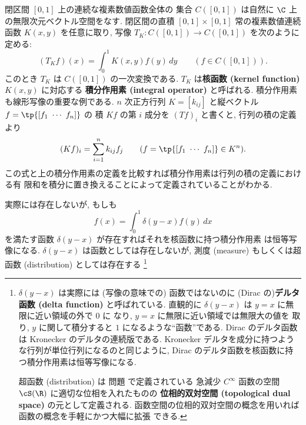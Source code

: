 \documentclass[12pt,twoside]{jarticle}
\begin{document}

\begin{example}[積分作用素]
  閉区間 $[0,1]$ 上の連続な複素数値函数全体の
  集合 $C([0,1])$ は自然に $\C$ 上の無限次元ベクトル空間をなす.  
  閉区間の直積 $[0,1]\times[0,1]$ 常の複素数値連続函数 $K(x,y)$ を任意に取り,
  写像 $T_K:C([0,1])\to C([0,1])$ を次のように定める:
  \begin{equation*}
    (T_K f)(x) = \int_0^1 K(x,y)f(y)\,dy
    \qquad (f\in C([0,1])).
  \end{equation*}
  このとき $T_K$ は $C([0,1])$ の一次変換である.
  $T_K$ は{\bf 核函数 (kernel function)} $K(x,y)$ に対応する
  {\bf 積分作用素 (integral operator)} と呼ばれる.
  積分作用素も線形写像の重要な例である.
  $n$ 次正方行列 $K=[k_{ij}]$ と縦ベクトル $f=\tp{[f_1\ \cdots\ f_n]}$ の
  積 $Kf$ の第 $i$ 成分を $(Tf)_i$ と書くと, 行列の積の定義より
  \begin{equation*}
    (Kf)_i = \sum_{i=1}^n k_{ij}f_j
    \qquad (f=\tp{[f_1\ \cdots\ f_n]}\in K^n).
  \end{equation*}
  この式と上の積分作用素の定義を比較すれば積分作用素は行列の積の定義における有
  限和を積分に置き換えることによって定義されていることがわかる.

  実際には存在しないが, もしも
  \begin{equation*}
    f(x) = \int_0^1 \delta(y-x)f(y)\,dx
  \end{equation*}
  を満たす函数 $\delta(y-x)$ が存在すればそれを核函数に持つ積分作用素
  は恒等写像になる.  $\delta(y-x)$ は函数としては存在しないが, 
  測度 (measure) もしくくは超函数 (distribution) としては存在する%
  \footnote{$\delta(y-x)$ は実際には (写像の意味での) 函数ではないのに 
    (Dirac の){\bf デルタ函数 (delta function)} と呼ばれている.  
    直観的に $\delta(y-x)$ は $y=x$ に無限に近い領域の外で $0$ に
    なり, $y=x$ に無限に近い領域では無限大の値を
    取り, $y$ に関して積分すると $1$ になるような``函数''である.
    Dirac のデルタ函数は Kronecker のデルタの連続版である.
    Kronecker デルタを成分に持つような行列が単位行列になるのと同じように,
    Dirac のデルタ函数を核函数に持つ積分作用素は恒等写像になる.

    超函数 (distribution) は
    問題  で定義されている
    急減少 $C^\infty$ 函数の空間 $\cS(\R)$ に適切な位相を入れたものの
    {\bf 位相的双対空間 (topological dual space)} の元として定義される.  
    函数空間の位相的双対空間の概念を用いれば函数の概念を手軽にかつ大幅に拡張
    できる. 

}
\end{example}
\end{document}
